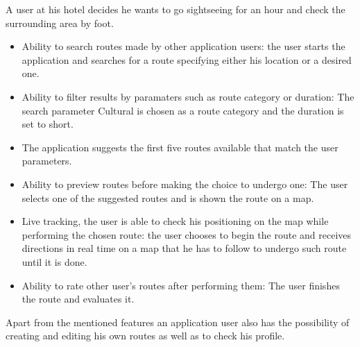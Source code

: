     A user at his hotel decides he wants to go sightseeing for an hour and check the surrounding area by foot.
    \begin{itemize}  
        \item Ability to search routes made by other application users: 
        the user starts the application and searches for a route specifying either his location or a desired one.
        \item Ability to filter results by paramaters such as route category or duration: 
        The search parameter Cultural is chosen as a route category and the duration is set to short.
        \item The application suggests the first five routes available that match the user parameters. 
        \item Ability to preview routes before making the choice to undergo one:
        The user selects one of the suggested routes and is shown the route on a map.
        \item Live tracking, the user is able to check his positioning on the map while performing the chosen route:
        the user chooses to begin the route and receives directions in real time on a map that he has to follow to undergo such route until it is done.
        \item Ability to rate other user's routes after performing them: 
        The user finishes the route and evaluates it. 
    \end{itemize}
    Apart from the mentioned features an application user also has the possibility of creating and editing his own routes as well as to check his profile.        
    